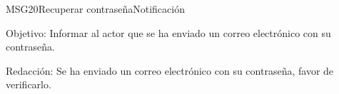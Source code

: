 \begin{mensaje}{MSG20}{Recuperar contraseña}{Notificación}
	\item [Objetivo:] Informar al actor que se ha enviado un correo electrónico con su contraseña.
	\item[Redacción:] Se ha enviado un correo electrónico con su contraseña, favor de verificarlo.
\end{mensaje}